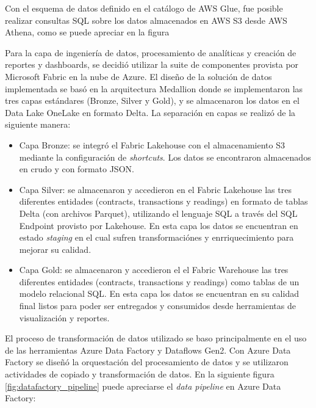 
Con el esquema de datos definido en el catálogo de AWS Glue, fue posible realizar consultas SQL sobre los datos almacenados en AWS S3 desde AWS Athena, como se puede apreciar en la figura 

Para la capa de ingeniería de datos, procesamiento de analíticas y creación de reportes y dashboards, se decidió utilizar la suite de componentes provista por Microsoft Fabric en la nube de Azure.
El diseño de la solución de datos implementada se basó en la arquitectura Medallion donde se implementaron las tres capas estándares (Bronze, Silver y Gold), y se almacenaron los datos en el Data Lake OneLake en formato Delta. La separación en capas se realizó de la siguiente manera:

\begin{itemize}
	\item Capa Bronze: se integró el Fabric Lakehouse con el almacenamiento S3 mediante la configuración de \textit{shortcuts}. Los datos se encontraron almacenados en crudo y con formato JSON.
	\item Capa Silver: se almacenaron y accedieron en el Fabric Lakehouse las tres diferentes entidades (contracts, transactions y readings) en formato de tablas Delta (con archivos Parquet), utilizando el lenguaje SQL a través del SQL Endpoint provisto por Lakehouse. En esta capa los datos se encuentran en estado \textit{staging} en el cual sufren transformaciónes y enrriquecimiento para mejorar su calidad.
	\item Capa Gold: se almacenaron y accedieron el el Fabric Warehouse las tres diferentes entidades (contracts, transactions y readings) como tablas de un modelo relacional SQL. En esta capa los datos se encuentran en su calidad final listos para poder ser entregados y consumidos desde herramientas de visualización y reportes.
\end{itemize}

El proceso de transformación de datos utilizado se baso principalmente en el uso de las herramientas Azure Data Factory y Dataflows Gen2. Con Azure Data Factory se diseñó la orquestación del procesamiento de datos y se utilizaron actividades de copiado y transformación de datos. En la siguiente figura \ref{fig:datafactory_pipeline} puede apreciarse el \textit{data pipeline} en Azure Data Factory:

